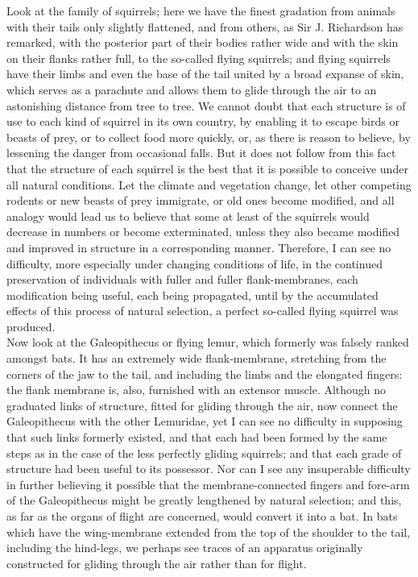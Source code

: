 \indent Look at the family of squirrels; here we have the finest gradation from animals with their tails only slightly flattened, and from others, as Sir J. Richardson has remarked, with the posterior part of their bodies rather wide and with the skin on their flanks rather full, to the so-called flying squirrels; and flying squirrels have their limbs and even the base of the tail united by a broad expanse of skin, which serves as a parachute and allows them to glide through the air to an astonishing distance from tree to tree. We cannot doubt that each structure is of use to each kind of squirrel in its own country, by enabling it to escape birds or beasts of prey, or to collect food more quickly, or, as there is reason to believe, by lessening the danger from occasional falls. But it does not follow from this fact that the structure of each squirrel is the best that it is possible to conceive under all natural conditions. Let the climate and vegetation change, let other competing rodents or new beasts of prey immigrate, or old ones become modified, and all analogy would lead us to believe that some at least of the squirrels would decrease in numbers or become exterminated, unless they also became modified and improved in structure in a corresponding manner. Therefore, I can see no difficulty, more especially under changing conditions of life, in the continued preservation of individuals with fuller and fuller flank-membranes, each modification being useful, each being propagated, until by the accumulated effects of this process of natural selection, a perfect so-called flying squirrel was produced.\\
\indent Now look at the Galeopithecus or flying lemur, which formerly was falsely ranked amongst bats. It has an extremely wide flank-membrane, stretching from the corners of the jaw to the tail, and including the limbs and the elongated fingers: the flank membrane is, also, furnished with an extensor muscle. Although no graduated links of structure, fitted for gliding through the air, now connect the Galeopithecus with the other Lemuridae, yet I can see no difficulty in supposing that such links formerly existed, and that each had been formed by the same steps as in the case of the less perfectly gliding squirrels; and that each grade of structure had been useful to its possessor. Nor can I see any insuperable difficulty in further believing it possible that the membrane-connected fingers and fore-arm of the Galeopithecus might be greatly lengthened by natural selection; and this, as far as the organs of flight are concerned, would convert it into a bat. In bats which have the wing-membrane extended from the top of the shoulder to the tail, including the hind-legs, we perhaps see traces of an apparatus originally constructed for gliding through the air rather than for flight.\\

